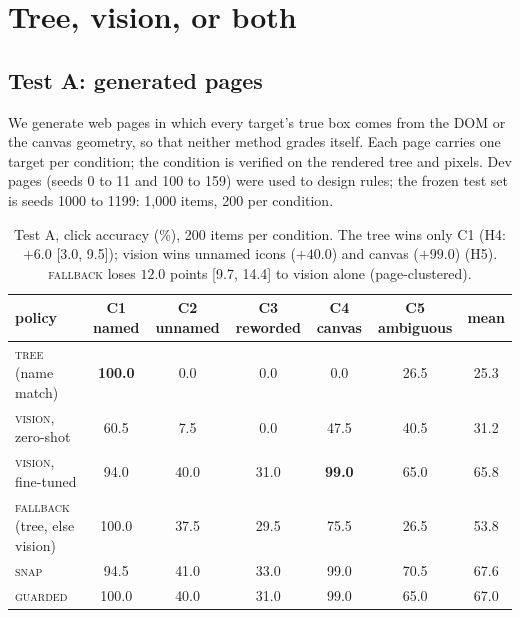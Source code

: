\documentclass[11pt]{article}
\newcommand{\tree}{\textsc{tree}}
\newcommand{\vis}{\textsc{vision}}
\newcommand{\fb}{\textsc{fallback}}
\begin{document}
\section{Tree, vision, or both}
\label{sec:compare}

\subsection{Test A: generated pages}
We generate web pages in which every target's true box comes from the DOM or the canvas geometry, so that
neither method grades itself. Each page carries one target per condition; the condition is verified on the
rendered tree and pixels. Dev pages (seeds 0 to 11 and 100 to 159) were used to design rules; the frozen test set is
seeds 1000 to 1199: 1,000 items, 200 per condition.

\begin{table}[t]
\centering\small
\begin{tabular}{lcccccc}
\toprule
policy & C1 named & C2 unnamed & C3 reworded & C4 canvas & C5 ambiguous & mean \\
\midrule
\tree{} (name match) & \textbf{100.0} & 0.0 & 0.0 & 0.0 & 26.5 & 25.3 \\
\vis, zero-shot & 60.5 & 7.5 & 0.0 & 47.5 & 40.5 & 31.2 \\
\vis, fine-tuned & 94.0 & 40.0 & 31.0 & \textbf{99.0} & 65.0 & 65.8 \\
\fb{} (tree, else vision) & 100.0 & 37.5 & 29.5 & 75.5 & 26.5 & 53.8 \\
\textsc{snap} & 94.5 & 41.0 & 33.0 & 99.0 & 70.5 & 67.6 \\
\textsc{guarded} & 100.0 & 40.0 & 31.0 & 99.0 & 65.0 & 67.0 \\
\bottomrule
\end{tabular}
\caption{Test A, click accuracy (\%), 200 items per condition. The tree wins only C1 (H4: $+6.0$
[3.0, 9.5]); vision wins unnamed icons ($+40.0$) and canvas ($+99.0$) (H5). \fb{} loses $12.0$ points
[9.7, 14.4] to vision alone (page-clustered).}
\label{tab:testa}
\end{table}
\end{document}
